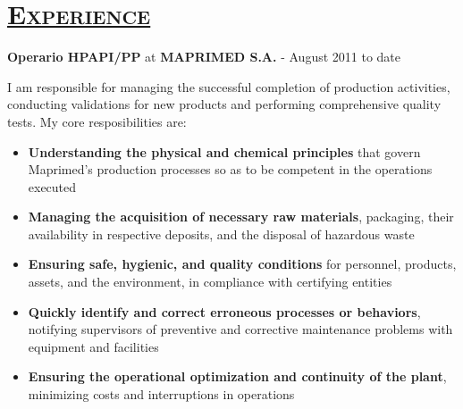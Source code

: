 \documentclass{resume} %
\begin{document}
\section*{\textsc{\underline{Experience}}}


{\bf Operario HPAPI/PP} at {\bf MAPRIMED S.A.} - {\textcolor{light-gray}{\small  August 2011 to date}}

\vspace{-5px}I am responsible for managing the successful completion of production activities, conducting validations for new products and performing comprehensive quality tests. My core resposibilities are:

\begin{itemize}[leftmargin=1cm]
  \setlength\itemsep{-7px}
  \item \textbf{Understanding the physical and chemical principles} that govern Maprimed's production processes so as to be competent in the operations executed
  \item \textbf{Managing the acquisition of necessary raw materials}, packaging, their availability in respective deposits, and the disposal of hazardous waste
  \item \textbf{Ensuring safe, hygienic, and quality conditions} for personnel, products, assets, and the environment, in compliance with certifying entities
  \item \textbf{Quickly identify and correct erroneous processes or behaviors}, notifying supervisors of preventive and corrective maintenance problems with equipment and facilities
  \item \textbf{Ensuring the operational optimization and continuity of the plant}, minimizing costs and interruptions in operations
\end{itemize}
\end{document}
